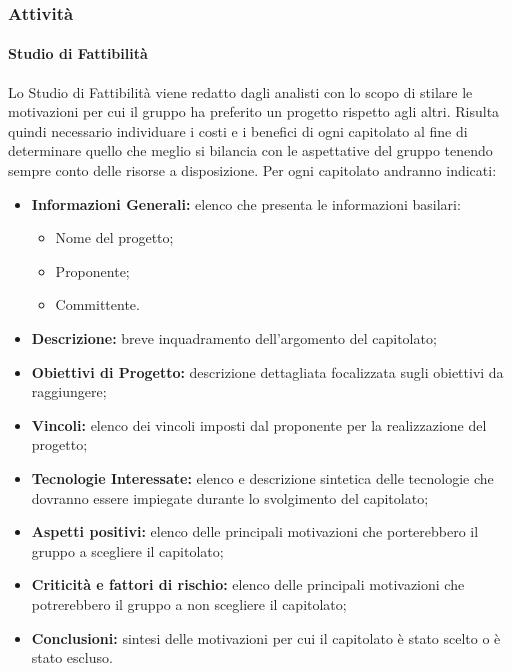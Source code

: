 \subsubsection{Attività}
\paragraph{Studio di Fattibilità}
Lo Studio di Fattibilità viene redatto dagli analisti con lo scopo di stilare le motivazioni per cui il gruppo ha preferito un progetto rispetto agli altri.
Risulta quindi necessario individuare i costi e i benefici di ogni capitolato al fine di determinare quello che meglio si bilancia con le aspettative del gruppo tenendo sempre conto delle risorse a disposizione.
Per ogni capitolato andranno indicati:
\begin{itemize}
	\item \textbf{Informazioni Generali:} elenco che presenta le informazioni basilari: 
	\begin{itemize}
		\item Nome del progetto;
		\item Proponente;
		\item Committente.
	\end{itemize} 
	\item \textbf{Descrizione:} breve inquadramento dell'argomento del capitolato\glosp;
	\item \textbf{Obiettivi di Progetto:} descrizione dettagliata focalizzata sugli obiettivi da raggiungere;
	\item \textbf{Vincoli:} elenco dei vincoli imposti dal proponente per la realizzazione del progetto;
	\item \textbf{Tecnologie Interessate:} elenco e descrizione sintetica delle tecnologie che dovranno essere impiegate durante lo svolgimento del capitolato\glo;
	\item \textbf{Aspetti positivi:} elenco delle principali motivazioni che porterebbero il gruppo a scegliere il capitolato;
	\item \textbf{Criticità e fattori di rischio:} elenco delle principali motivazioni che potrerebbero il gruppo a non scegliere il capitolato;
	\item \textbf{Conclusioni:} sintesi delle motivazioni per cui il capitolato è stato scelto o è stato escluso.
\end{itemize}
